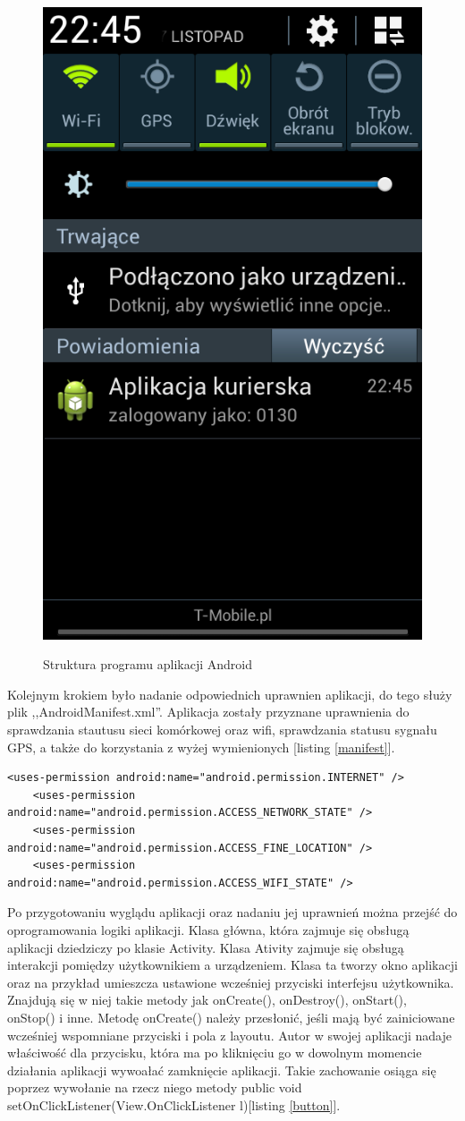 \documentclass[eng,printmode,oneside]{mgr}
\begin{document}
\begin{figure}
{\includegraphics[width=25ex]{andBarZal.png}
\label{androidViewtask}
}
\vspace{-10pt}
 \caption{Struktura programu aplikacji Android}
\vspace{-10pt}

\end{figure}

Kolejnym krokiem było nadanie odpowiednich uprawnien aplikacji, do tego służy
plik ,,AndroidManifest.xml''. Aplikacja zostały przyznane uprawnienia do
sprawdzania stautusu sieci komórkowej oraz wifi, sprawdzania statusu sygnału
GPS, a także do korzystania z wyżej wymienionych [listing \ref{manifest}].

\begin{lstlisting}[caption=Nadanie uprawnień aplikacji Android,label=manifest]
	<uses-permission android:name="android.permission.INTERNET" />
	<uses-permission android:name="android.permission.ACCESS_NETWORK_STATE" />
	<uses-permission android:name="android.permission.ACCESS_FINE_LOCATION" />
	<uses-permission android:name="android.permission.ACCESS_WIFI_STATE" />
\end{lstlisting}


Po przygotowaniu wyglądu aplikacji oraz nadaniu jej uprawnień można przejść
do oprogramowania logiki aplikacji. Klasa główna, która zajmuje się obsługą
aplikacji dziedziczy po klasie Activity. Klasa Ativity zajmuje się obsługą
interakcji pomiędzy użytkownikiem a urządzeniem. Klasa ta tworzy okno aplikacji
oraz na przykład umieszcza ustawione wcześniej przyciski interfejsu użytkownika.
Znajdują się w niej takie metody jak onCreate(), onDestroy(), onStart(), onStop()
i inne. Metodę onCreate() należy przesłonić, jeśli mają być zainiciowane
wcześniej wspomniane przyciski i pola z layoutu. Autor w swojej aplikacji nadaje
właściwość dla przycisku, która ma po kliknięciu go w dowolnym momencie
działania aplikacji wywoałać zamknięcie aplikacji. Takie zachowanie osiąga się
poprzez wywołanie na rzecz niego metody public void
setOnClickListener(View.OnClickListener l)[listing \ref{button}].
\end{document}
